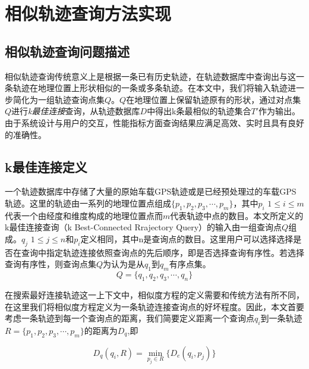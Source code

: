 
\theoremstyle{definition}
\newtheorem{definition}{定义}[section]

\chapter{相似轨迹查询方法实现}
\label{chap:implementation}

\section{相似轨迹查询问题描述}
\label{sec:question describe}
相似轨迹查询传统意义上是根据一条已有历史轨迹，在轨迹数据库中查询出与这一条轨迹在地理位置上形状相似的一条或多条轨迹。在本文中，我们将输入轨迹进一步简化为一组轨迹查询点集$Q$。$Q$在地理位置上保留轨迹原有的形状，通过对点集$Q$进行\emph{k最佳连接}查询，从轨迹数据库$D$中得出k条最相似的轨迹集合$T'$作为输出。由于系统设计与用户的交互，性能指标方面查询结果应满足高效、实时且具有良好的准确性。

\section{k最佳连接定义}
\label{sec:k-bct}
一个轨迹数据库中存储了大量的原始车载GPS轨迹或是已经预处理过的车载GPS轨迹。这里的轨迹由一系列的地理位置点组成$\{p_{1},p_{2},p_{3},\cdots, p_{m}\}$，其中$p_{i}$ $1\leq i \leq m$代表一个由经度和维度构成的地理位置点而$m$代表轨迹中点的数目。本文所定义的k最佳连接查询（k Best-Connected Rrajectory Query）的输入由一组查询点$Q$组成。$q_{j}$ $1 \leq j \leq n$和$p_{i}$定义相同，其中n是查询点的数目。这里用户可以选择选择是否在查询中指定轨迹连接依照查询点的先后顺序，即是否选择查询有序性。若选择查询有序性，则查询点集$Q$为认为是从$q_{1}$到$q_{m}$有序点集。
\begin{displaymath}
	Q = \{q_{1},q_{2},q_{3},\cdots, q_{n}\}
\end{displaymath}

在搜索最好连接轨迹这一上下文中，相似度方程的定义需要和传统方法有所不同，在这里我们将相似度方程定义为一条轨迹连接查询点的好坏程度。因此，本文首要考虑一条轨迹到每一个查询点的距离，我们简要定义距离一个查询点$q_{i}$到一条轨迹$R=\{p_{1},p_{2},p_{3},\cdots, p_{m}\}$的距离为$D_{q}$,即

\begin{equation}
	\label{eq3-1}
	D_{q}(q_{i}, R) = \min_{p_{j} \in R} \{D_{e}(q_{i}, p_{j})\} 
\end{equation}

